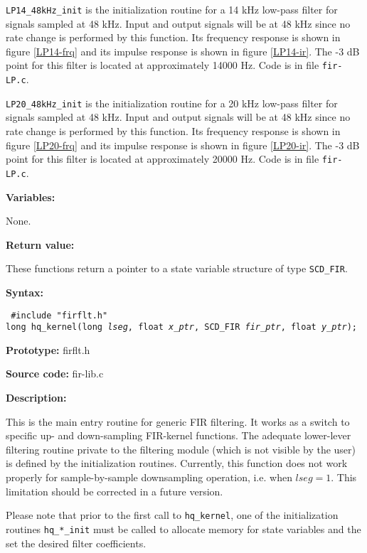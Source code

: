 {\tt LP14\_48kHz\_init} is the initialization routine for a 14 kHz
low-pass filter for signals sampled at 48 kHz. Input and output
signals will be at 48 kHz since no rate change is performed by this
function. Its frequency response is shown in figure \ref{LP14-frq}
and its impulse response is shown in figure \ref{LP14-ir}. The -3 dB
point for this filter is located at approximately 14000 Hz. Code is
in file {\tt fir-LP.c}.

{\tt LP20\_48kHz\_init} is the initialization routine for a 20 kHz
low-pass filter for signals sampled at 48 kHz. Input and output
signals will be at 48 kHz since no rate change is performed by this
function. Its frequency response is shown in figure \ref{LP20-frq}
and its impulse response is shown in figure \ref{LP20-ir}. The -3 dB
point for this filter is located at approximately 20000 Hz. Code is
in file {\tt fir-LP.c}.



{\bf Variables: }

None.

{\bf Return value: }

These functions return a pointer to a state variable structure of type
{\tt SCD\_FIR}.



{\bf Syntax: }

{\tt
\#include "firflt.h"\\
long hq\_kernel(long {\em lseg}, float {\em *x\_ptr},
              SCD\_FIR {\em *fir\_ptr},
              float {\em *y\_ptr});
}

{\bf Prototype: }    firflt.h

{\bf Source code: }  fir-lib.c

{\bf Description: }

This is the main entry routine for generic FIR filtering. It works as
a switch to specific up- and down-sampling FIR-kernel functions. The
adequate lower-lever filtering routine private to the filtering module
(which is not visible by the user) is defined by the initialization
routines. Currently, this function does not work properly for
sample-by-sample downsampling operation, i.e. when $lseg=1$. This
limitation should be corrected in a future version.

Please note that prior to the first call to {\tt hq\_kernel}, one of
the initialization routines {\tt hq\_*\_init} must be called
to allocate memory for state variables and the set the desired filter
coefficients.


